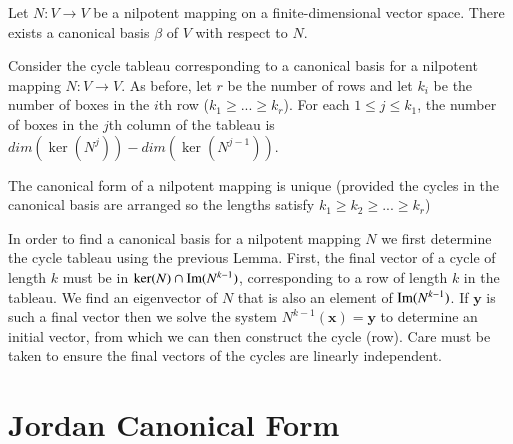 \documentclass[12pt, a4paper, oneside, openright, titlepage]{book}
\newcommand{\mb}[1]{\mathbf{#1}}
\begin{document}
\begin{thm}
    Let $N:V\rightarrow V$ be a nilpotent mapping on a finite-dimensional vector space. There exists a canonical basis $\beta$ of $V$ with respect to $N$.
\end{thm}


\begin{lem}
    Consider the cycle tableau corresponding to a canonical basis for a nilpotent mapping $N:V \rightarrow V$. As before, let $r$ be the number of rows and let $k_i$ be the number of boxes in the $i$th row ($k_1 \geq ... \geq k_r$). For each $1 \leq j \leq k_1$, the number of boxes in the $j$th column of the tableau is $dim(\ker(N^j)) - dim(\ker(N^{j-1}))$.
\end{lem}


\begin{cor}
    The canonical form of a nilpotent mapping is unique (provided the cycles in the canonical basis are arranged so the lengths satisfy $k_1 \geq k_2 \geq ... \geq k_r$)
\end{cor}


\begin{rmk}
    In order to find a canonical basis for a nilpotent mapping $N$ we first determine the cycle tableau using the previous Lemma. First, the final vector of a cycle of length $k$ must be in $\ker(N) \cap \operatorname{Im}(N^{k-1})$, corresponding to a row of length $k$ in the tableau. We find an eigenvector of $N$ that is also an element of $\operatorname{Im}(N^{k-1})$. If $\mb y$ is such a final vector then we solve the system $N^{k-1}(\mb x) = \mb y$ to determine an initial vector, from which we can then construct the cycle (row). Care must be taken to ensure the final vectors of the cycles are linearly independent.
\end{rmk}



\section{Jordan Canonical Form}
\end{document}
